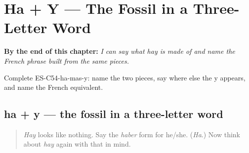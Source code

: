 
\chapter{Ha + Y --- The Fossil in a Three-Letter Word}
\label{ch:hay-etymology}

\begin{chapteropening}
\textbf{By the end of this chapter:} \emph{I can say what hay is made of and name the French phrase built from the same pieces.}

Complete ES-C54-ha-mas-y: name the two pieces, say where else the y appears, and name the French equivalent.
\end{chapteropening}

\section[ha + y]{ha + y — the fossil in a three-letter word}

\label{lesson:ES-C54-ha-mas-y}



\begin{quote}
\emph{Hay} looks like nothing. Say the \emph{haber} form for he/she. (\emph{Ha}.) Now think about \emph{hay} again with that in mind.
\end{quote}

